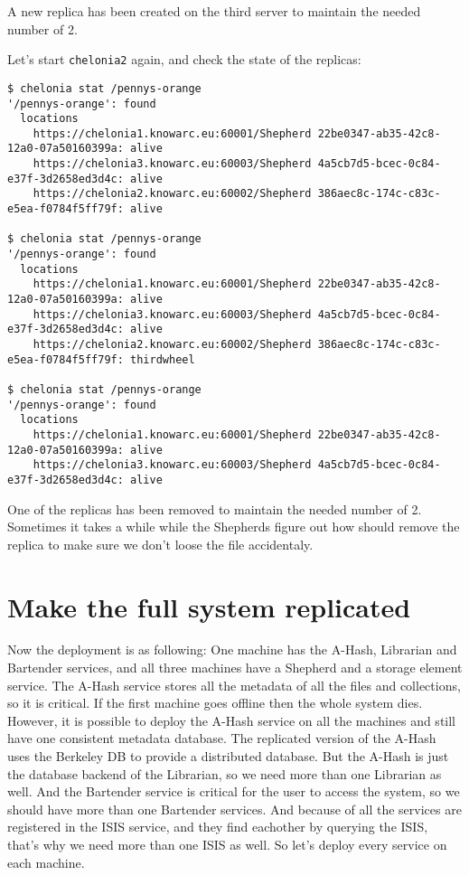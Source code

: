 \documentclass{article}
\begin{document}
A new replica has been created on the third server to maintain the needed number of 2.

Let's start \verb!chelonia2! again, and check the state of the replicas:

\begin{verbatim}
$ chelonia stat /pennys-orange
'/pennys-orange': found
  locations
    https://chelonia1.knowarc.eu:60001/Shepherd 22be0347-ab35-42c8-12a0-07a50160399a: alive
    https://chelonia3.knowarc.eu:60003/Shepherd 4a5cb7d5-bcec-0c84-e37f-3d2658ed3d4c: alive
    https://chelonia2.knowarc.eu:60002/Shepherd 386aec8c-174c-c83c-e5ea-f0784f5ff79f: alive
    
$ chelonia stat /pennys-orange
'/pennys-orange': found
  locations
    https://chelonia1.knowarc.eu:60001/Shepherd 22be0347-ab35-42c8-12a0-07a50160399a: alive
    https://chelonia3.knowarc.eu:60003/Shepherd 4a5cb7d5-bcec-0c84-e37f-3d2658ed3d4c: alive
    https://chelonia2.knowarc.eu:60002/Shepherd 386aec8c-174c-c83c-e5ea-f0784f5ff79f: thirdwheel
    
$ chelonia stat /pennys-orange
'/pennys-orange': found
  locations
    https://chelonia1.knowarc.eu:60001/Shepherd 22be0347-ab35-42c8-12a0-07a50160399a: alive
    https://chelonia3.knowarc.eu:60003/Shepherd 4a5cb7d5-bcec-0c84-e37f-3d2658ed3d4c: alive
\end{verbatim}

One of the replicas has been removed to maintain the needed number of 2. Sometimes it takes a while while the Shepherds figure out how should remove the replica to make sure we don't loose the file accidentaly.

\section{Make the full system replicated} %
\label{sec:make_the_a_hash_service_replicated}

Now the deployment is as following: One machine has the A-Hash, Librarian and Bartender services, and all three machines have a Shepherd and a storage element service. The A-Hash service stores all the metadata of all the files and collections, so it is critical. If the first machine goes offline then the whole system dies. However, it is possible to deploy the A-Hash service on all the machines and still have one consistent metadata database. The replicated version of the A-Hash uses the Berkeley DB to provide a distributed database. But the A-Hash is just the database backend of the Librarian, so we need more than one Librarian as well. And the Bartender service is critical for the user to access the system, so we should have more than one Bartender services. And because of all the services are registered in the ISIS service, and they find eachother by querying the ISIS, that's why we need more than one ISIS as well. So let's deploy every service on each machine.
\end{document}
